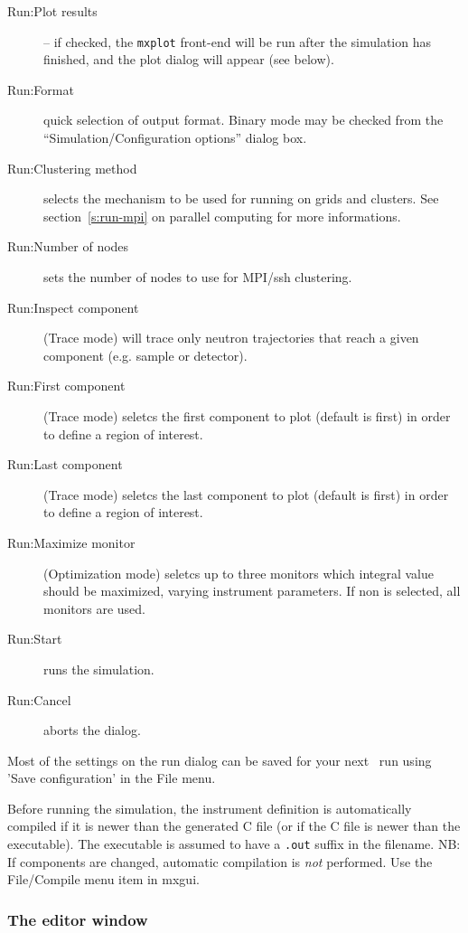 \begin{description}
\item[Run:Plot results] -- if checked, the \verb+mxplot+ front-end will be run
  after the simulation has finished, and the plot dialog will appear
  (see below).
\item[Run:Format] quick selection of output format. Binary mode may be checked from the ``Simulation/Configuration options'' dialog box.
\item[Run:Clustering method] selects the mechanism to be used for running on grids and clusters.
  See section~\ref{s:run-mpi} on parallel computing for more informations.
\item[Run:Number of nodes] sets the number of nodes to use for MPI/ssh clustering.
\item[Run:Inspect component] (Trace mode) will trace only neutron trajectories that reach a given component (e.g. sample or detector).
\item[Run:First component] (Trace mode) seletcs the first component to plot (default is first) in order to define a region of interest.
\item[Run:Last component] (Trace mode) seletcs the last component to plot (default is first) in order to define a region of interest.
\item[Run:Maximize monitor] (Optimization mode) seletcs up to three monitors which integral value should be maximized, varying instrument parameters. If non is selected, all monitors are used.
\item[Run:Start] runs the simulation.
\item[Run:Cancel] aborts the dialog.
\end{description}
Most of the settings on the run dialog can be saved for your next
\MCX\ run using 'Save configuration' in the File menu.

Before running the simulation, the instrument definition is
automatically compiled if it is newer than the generated C file (or if the C file
is newer than the executable). The executable is
assumed to have a \verb+.out+ suffix in the filename. NB: If
components are changed, automatic compilation is \emph{not}
performed. Use the File/Compile menu item in mxgui.



\subsubsection{The editor window}

